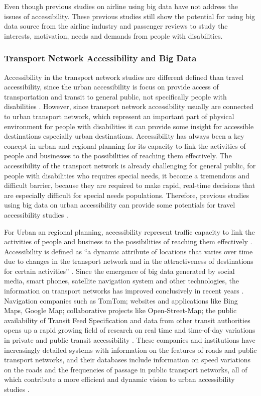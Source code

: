 Even though previous studies on airline using big data have not address the issues 
of accessibility. These previous studies still show the potential for using big data 
source from the airline industry and passenger reviews to study the interests, 
motivation, needs and demands from people with disabilities.



\subsubsection{Transport Network Accessibility and Big Data}
Accessibility in the transport network studies are different defined than travel 
accessibility, since the urban accessibility is focus on provide access of 
transportation and transit to general public, not specifically people with 
disabilities \cite{moya2016dynamic}. However, since transport network accessibility 
usually are connected to urban transport network, which represent an important 
part of physical environment for people with disabilities it can provide some insight for 
accessible destinations especially urban destinations. Accessibility has always been a key 
concept in urban and regional planning for its capacity to link the activities 
of people and businesses to the possibilities of reaching them effectively. 
The accessibility of the transport network is already challenging for general 
public, for people with disabilities who requires special needs, it become a 
tremendous and difficult barrier, because they are required to make rapid, 
real-time decisions that are especially difficult for special needs populations. 
Therefore, previous studies using big data on urban accessibility can provide 
some potentials for travel accessibility studies \cite{Barbeau}.

For Urban an regional planning, accessibility represent traffic capacity to link the 
activities of people and business to the possibilities of reaching them effectively 
\cite{moya2016dynamic}. Accessibility is defined as ``a dynamic attribute of locations
that varies over time due to changes in the transport network and in the attractiveness 
of destinations for certain activities'' \cite{moya2016dynamic}. Since the emergence of
big data generated by social media, smart phones, satellite navigation system and other 
technologies,  the information on transport networks has improved conclusively in recent 
years \cite{Barbeau}. Navigation companies such as TomTom; websites and applications 
like Bing Maps, Google Map; collaborative projects like Open-Street-Map; the public 
availability of Transit Feed Specification and data from other transit authorities 
opens up a rapid growing field of research on real time and time-of-day variations 
in private and public transit accessibility \cite{moya2016dynamic}. These companies 
and institutions have increasingly detailed systems with information on the features 
of roads and public transport networks, and their databases include information on 
speed variations on the roads and the frequencies of passage in public transport
networks, all of which contribute a more efficient and dynamic vision to urban 
accessibility studies \cite{moya2016dynamic}.

